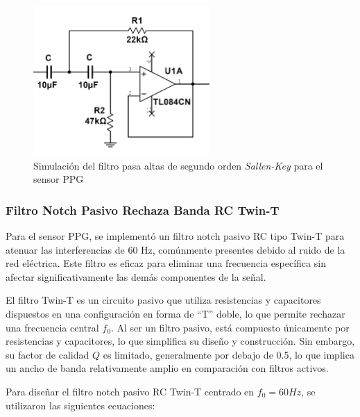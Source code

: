         \begin{figure}[H]
            \centering
            \includegraphics[width=0.6\textwidth]{img/Desarrollo/multisim_pasaAltos_ppg.png}
            \caption[Simulación del filtro pasa altas de segundo orden \textit{Sallen-Key} para el sensor PPG.]{Simulación del filtro pasa altas de segundo orden \textit{Sallen-Key} para el sensor PPG\footnotemark}
            \label{fig:Simulacion_Filtro_Pasa_Altas_PPG}
        \end{figure}

        \subsubsection{Filtro Notch Pasivo Rechaza Banda RC Twin-T}

        Para el sensor PPG, se implementó un filtro notch pasivo RC tipo Twin-T para atenuar las interferencias de 60 Hz, comúnmente presentes debido al ruido de la red eléctrica. Este filtro es eficaz para eliminar una frecuencia específica sin afectar significativamente las demás componentes de la señal.

        El filtro Twin-T es un circuito pasivo que utiliza resistencias y capacitores dispuestos en una configuración en forma de ``T'' doble, lo que permite rechazar una frecuencia central $f_0$. Al ser un filtro pasivo, está compuesto únicamente por resistencias y capacitores, lo que simplifica su diseño y construcción. Sin embargo, su factor de calidad $Q$ es limitado, generalmente por debajo de 0.5, lo que implica un ancho de banda relativamente amplio en comparación con filtros activos.

        Para diseñar el filtro notch pasivo RC Twin-T centrado en $f_0 = 60 Hz$, se utilizaron las siguientes ecuaciones:

